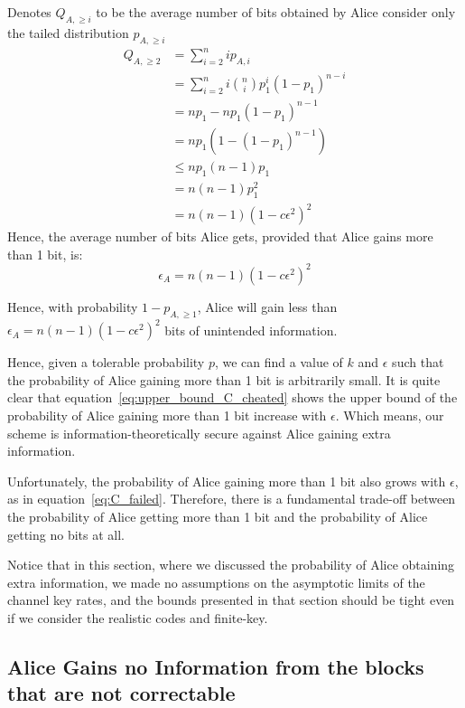 \documentclass[%
 reprint,
superscriptaddress,
 amsmath,amssymb,
 aps,
]{revtex4-2}
\begin{document}
Denotes $Q_{A, \ge i}$ to be the average number of bits obtained by Alice consider only the tailed distribution $p_{A, \ge i}$
\begin{equation}
    \begin{split}
    Q_{A, \ge2}
    &= \sum_{i=2}^n ip_{A, i}\\
    &=\sum_{i=2}^ni\binom{n}{i}p_1^i(1-p_1)^{n-i}\\
    &=np_1-np_1(1-p_1)^{n-1}\\
    &=np_1(1-(1-p_1)^{n-1})\\
    &\le np_1(n-1)p_1\\
    &=n(n-1)p_1^2\\
    &=n(n-1)(1-c\epsilon^2)^2
    \end{split}
\end{equation}
Hence, the average number of bits Alice gets, provided that Alice gains more than 1 bit, is:
\begin{equation}
    \epsilon_A = n(n-1)(1-c\epsilon^2)^2
\end{equation}

Hence, with probability $1- p_{A, \ge 1}$, Alice will gain less than $\epsilon_A=n(n-1)(1-c\epsilon^2)^2$ bits of unintended information.

Hence, given a tolerable probability $p$, we can find a value of $k$ and $\epsilon$ such that the probability of Alice gaining more than 1 bit is arbitrarily small. It is quite clear that equation~\ref{eq:upper_bound_C_cheated} shows the upper bound of the probability of Alice gaining more than 1 bit increase with $\epsilon$. Which means, our scheme is information-theoretically secure against Alice gaining extra information.

Unfortunately, the probability of Alice gaining more than 1 bit also grows with $\epsilon$, as in equation~\ref{eq:C_failed}. Therefore, there is a fundamental trade-off between the probability of Alice getting more than 1 bit and the probability of Alice getting no bits at all.

Notice that in this section, where we discussed the probability of Alice obtaining extra information, we made no assumptions on the asymptotic limits of the channel key rates, and the bounds presented in that section should be tight even if we consider the realistic codes and finite-key.

\subsection{Alice Gains no Information from the blocks that are not correctable}
\end{document}
